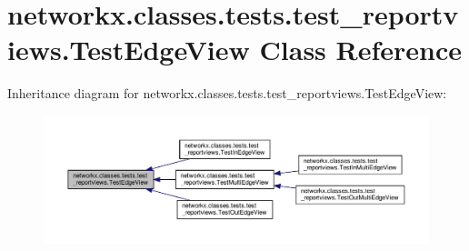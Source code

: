 \hypertarget{classnetworkx_1_1classes_1_1tests_1_1test__reportviews_1_1TestEdgeView}{}\section{networkx.\+classes.\+tests.\+test\+\_\+reportviews.\+Test\+Edge\+View Class Reference}
\label{classnetworkx_1_1classes_1_1tests_1_1test__reportviews_1_1TestEdgeView}


Inheritance diagram for networkx.\+classes.\+tests.\+test\+\_\+reportviews.\+Test\+Edge\+View\+:
\nopagebreak
\begin{figure}[H]
\begin{center}
\leavevmode
\includegraphics[width=350pt]{classnetworkx_1_1classes_1_1tests_1_1test__reportviews_1_1TestEdgeView__inherit__graph}
\end{center}
\end{figure}
